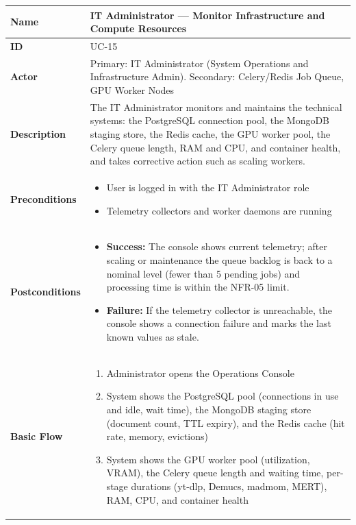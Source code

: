 \documentclass[a4paper]{article}
\newlength{\ucLeft}
\begin{document}
\begin{longtable}{|>{\bfseries}p{\ucLeft}|p{\dimexpr\linewidth-\ucLeft-2\tabcolsep-2\arrayrulewidth}|}
\hline
Name & IT Administrator --- Monitor Infrastructure and Compute Resources \\ \hline
ID & UC-15 \\ \hline
Actor & Primary: IT Administrator (System Operations and Infrastructure Admin). Secondary: Celery/Redis Job Queue, GPU Worker Nodes \\ \hline
Description & The IT Administrator monitors and maintains the technical systems: the PostgreSQL connection pool, the MongoDB staging store, the Redis cache, the GPU worker pool, the Celery queue length, RAM and CPU, and container health, and takes corrective action such as scaling workers. \\ \hline
Preconditions &
\begin{itemize}[leftmargin=1em, nosep, topsep=2pt, partopsep=0pt, parsep=0pt, after=\strut]
    \item User is logged in with the IT Administrator role
    \item Telemetry collectors and worker daemons are running
\end{itemize}
\\ \hline
Postconditions &
\begin{itemize}[leftmargin=1em, nosep, topsep=2pt, partopsep=0pt, parsep=0pt, after=\strut]
    \item \textbf{Success:} The console shows current telemetry; after scaling or maintenance the queue backlog is back to a nominal level (fewer than 5 pending jobs) and processing time is within the NFR-05 limit.
    \item \textbf{Failure:} If the telemetry collector is unreachable, the console shows a connection failure and marks the last known values as stale.
\end{itemize}
\\ \hline
Basic Flow &
\begin{enumerate}[leftmargin=1.5em, nosep, topsep=2pt, partopsep=0pt, parsep=0pt, after=\strut]
    \item Administrator opens the Operations Console
    \item System shows the PostgreSQL pool (connections in use and idle, wait time), the MongoDB staging store (document count, TTL expiry), and the Redis cache (hit rate, memory, evictions)
    \item System shows the GPU worker pool (utilization, VRAM), the Celery queue length and waiting time, per-stage durations (yt-dlp, Demucs, madmom, MERT), RAM, CPU, and container health

\end{enumerate}
\end{longtable}
\end{document}
